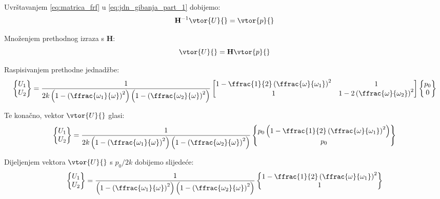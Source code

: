 Uvrštavanjem \eqref{eq:matrica_frf} u \eqref{eq:jdn_gibanja_part_1} dobijemo:
\begin{equation}
    \mathbf{H}^{-1}\vtor{U}{}=\vtor{p}{}
\end{equation}

Množenjem prethodnog izraza s $\mathbf{H}$:
\begin{equation}
    \vtor{U}{} = \mathbf{H}\vtor{p}{}
\end{equation}

Raspisivanjem prethodne jednadžbe:
\begin{equation}
    \begin{Bmatrix}
        U_1\\
        U_2
    \end{Bmatrix}
    =
    \frac{1}{2k\left(1-\left(\ffrac{\omega_1}{\omega}\right)^2\right)\left(1-\left(\ffrac{\omega_2}{\omega}\right)^2\right)}
    \begin{bmatrix}
        1-\ffrac{1}{2}\left(\ffrac{\omega}{\omega_1}\right)^2 & 1 \\
        1 & 1-2\left(\ffrac{\omega}{\omega_2}\right)^2
    \end{bmatrix}
    \begin{Bmatrix}
        p_0\\
        0
    \end{Bmatrix}
\end{equation}

Te konačno, vektor $\vtor{U}{}$ glasi:
\begin{equation}\label{eq:vektor_u_konacno}
    \begin{Bmatrix}
        U_1\\
        U_2
    \end{Bmatrix}
    =
    \frac{1}{2k\left(1-\left(\ffrac{\omega_1}{\omega}\right)^2\right)\left(1-\left(\ffrac{\omega_2}{\omega}\right)^2\right)}
    \begin{Bmatrix}
        p_0\left(1-\ffrac{1}{2}\left(\ffrac{\omega}{\omega_1}\right)^2\right)\\
        p_0 
    \end{Bmatrix}
\end{equation}

Dijeljenjem vektora $\vtor{U}{}$ s $p_0/2k$ dobijemo slijedeće:
\begin{equation}
    \begin{Bmatrix}
        U_1\\
        U_2
    \end{Bmatrix}
    =
    \frac{1}{\left(1-\left(\ffrac{\omega_1}{\omega}\right)^2\right)\left(1-\left(\ffrac{\omega_2}{\omega}\right)^2\right)}
    \begin{Bmatrix}
        1-\ffrac{1}{2}\left(\ffrac{\omega}{\omega_1}\right)^2\\
        1 
    \end{Bmatrix}
\end{equation}

